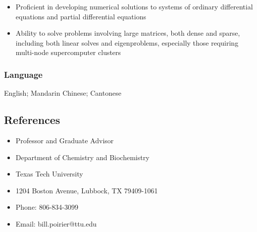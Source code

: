 \documentclass[
]{article}
\providecommand{\tightlist}{%
  \setlength{\itemsep}{0pt}\setlength{\parskip}{0pt}}
\begin{document}
\begin{itemize}
\tightlist
\item
  Proficient in developing numerical solutions to systems of ordinary
  differential equations and partial differential equations
\item
  Ability to solve problems involving large matrices, both dense and
  sparse, including both linear solves and eigenproblems, especially
  those requiring multi-node supercomputer clusters
\end{itemize}

\hypertarget{language}{%
\subsubsection{Language}\label{language}}

English; Mandarin Chinese; Cantonese

\hypertarget{references}{%
\subsection{References}\label{references}}

\begin{itemize}
\tightlist
\item
  Professor and Graduate Advisor
\item
  Department of Chemistry and Biochemistry
\item
  Texas Tech University
\item
  1204 Boston Avenue, Lubbock, TX 79409-1061
\item
  Phone: 806-834-3099
\item
  Email: bill.poirier@ttu.edu
\end{itemize}
\end{document}
